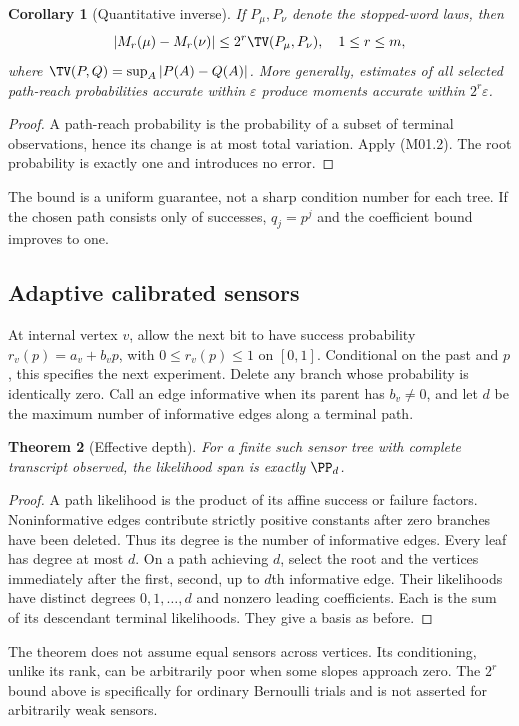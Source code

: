 \documentclass[11pt,a4paper]{article}
\newtheorem{theorem}{Theorem}[section]
\newtheorem{corollary}[theorem]{Corollary}
\theoremstyle{definition}\newtheorem{definition}[theorem]{Definition}
\theoremstyle{remark}\newtheorem{remark}[theorem]{Remark}
\numberwithin{equation}{section}
\begin{document}
\begin{corollary}[Quantitative inverse]
If $P_\mu,P_\nu$ denote the stopped-word laws, then
\[
 |M_r(\mu)-M_r(\nu)|\le 2^r\TV(P_\mu,P_\nu),\quad 1\le r\le m,
\]
where $\TV(P,Q)=\sup_A|P(A)-Q(A)|$. More generally, estimates of all selected path-reach probabilities accurate within $\varepsilon$ produce moments accurate within $2^r\varepsilon$.
\end{corollary}
\begin{proof}
A path-reach probability is the probability of a subset of terminal observations, hence its change is at most total variation. Apply (M01.2). The root probability is exactly one and introduces no error.
\end{proof}
The bound is a uniform guarantee, not a sharp condition number for each tree. If the chosen path consists only of successes, $q_j=p^j$ and the coefficient bound improves to one.

\subsection{Adaptive calibrated sensors}\label{M01-sec-3}
At internal vertex $v$, allow the next bit to have success probability $r_v(p)=a_v+b_vp$, with $0\le r_v(p)\le1$ on $[0,1]$. Conditional on the past and $p$, this specifies the next experiment. Delete any branch whose probability is identically zero. Call an edge informative when its parent has $b_v\ne0$, and let $d$ be the maximum number of informative edges along a terminal path.

\begin{theorem}[Effective depth]
For a finite such sensor tree with complete transcript observed, the likelihood span is exactly $\PP_d$.
\end{theorem}
\begin{proof}
A path likelihood is the product of its affine success or failure factors. Noninformative edges contribute strictly positive constants after zero branches have been deleted. Thus its degree is the number of informative edges. Every leaf has degree at most $d$. On a path achieving $d$, select the root and the vertices immediately after the first, second, up to $d$th informative edge. Their likelihoods have distinct degrees $0,1,\ldots,d$ and nonzero leading coefficients. Each is the sum of its descendant terminal likelihoods. They give a basis as before.
\end{proof}
The theorem does not assume equal sensors across vertices. Its conditioning, unlike its rank, can be arbitrarily poor when some slopes approach zero. The $2^r$ bound above is specifically for ordinary Bernoulli trials and is not asserted for arbitrarily weak sensors.
\end{document}

